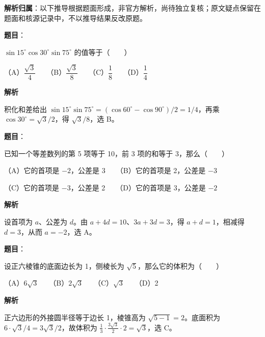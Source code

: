 

\begin{gknotice}
\textbf{解析归属}：以下推导根据题面形成，非官方解析，尚待独立复核；原文疑点保留在题面和核源记录中，不以推导结果反改原题。
\end{gknotice}

\begin{answer}

\textbf{题目}：

$\sin15^\circ\cos30^\circ\sin75^\circ$ 的值等于\mbox{（　　）}

（A）$\dfrac{\sqrt3}4$　　（B）$\dfrac{\sqrt3}8$　　（C）$\dfrac18$　　（D）$\dfrac14$

\textbf{解析}

积化和差给出 $\sin15^\circ\sin75^\circ=(\cos60^\circ-\cos90^\circ)/2=1/4$，再乘 $\cos30^\circ=\sqrt3/2$，得 $\sqrt3/8$，选 B。


\end{answer}
\begin{answer}

\textbf{题目}：

已知一个等差数列的第 5 项等于 10，前 3 项的和等于 3，那么\mbox{（　　）}

（A）它的首项是 $-2$，公差是 3　　（B）它的首项是 2，公差是 $-3$

（C）它的首项是 $-3$，公差是 2　　（D）它的首项是 3，公差是 $-2$

\textbf{解析}

设首项为 $a$、公差为 $d$。由 $a+4d=10$、$3a+3d=3$，得 $a+d=1$，相减得 $d=3$，从而 $a=-2$，选 A。


\end{answer}
\begin{answer}

\textbf{题目}：

设正六棱锥的底面边长为 1，侧棱长为 $\sqrt5$，那么它的体积为\mbox{（　　）}

（A）$6\sqrt3$　　（B）$2\sqrt3$　　（C）$\sqrt3$　　（D）2

\textbf{解析}

正六边形的外接圆半径等于边长 1，棱锥高为 $\sqrt{5-1}=2$。底面积为 $6\cdot\sqrt3/4=3\sqrt3/2$，故体积为 $\frac13\cdot\frac{3\sqrt3}2\cdot2=\sqrt3$，选 C。


\end{answer}

